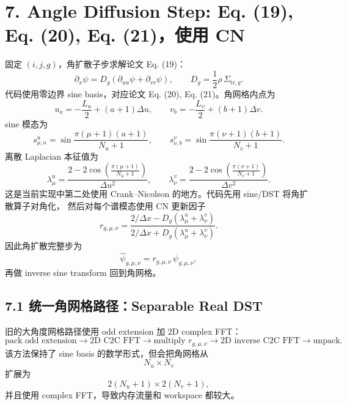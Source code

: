 \documentclass[11pt,a4paper]{ctexart}
\begin{document}
\section*{7. Angle Diffusion Step: Eq. (19), Eq. (20), Eq. (21)，使用 CN}

固定 \((i,j,g)\)，角扩散子步求解论文 Eq. (19)：
\begin{equation}
  \partial_x\psi
  =
  D_g(\partial_{uu}\psi+\partial_{vv}\psi),
  \qquad
  D_g=\frac12\rho\,\Sigma_{\mathrm{tr},g}.
\end{equation}
代码使用零边界 sine basis，对应论文 Eq. (20), Eq. (21)。角网格内点为
\begin{equation}
  u_a=-\frac{L_u}{2}+(a+1)\Delta u,\qquad
  v_b=-\frac{L_v}{2}+(b+1)\Delta v.
\end{equation}
sine 模态为
\begin{equation}
  s^u_{\mu,a}=\sin\frac{\pi(\mu+1)(a+1)}{N_u+1},
  \qquad
  s^v_{\nu,b}=\sin\frac{\pi(\nu+1)(b+1)}{N_v+1}.
\end{equation}
离散 Laplacian 本征值为
\begin{equation}
  \lambda^u_\mu
  =
  \frac{2-2\cos\left(\frac{\pi(\mu+1)}{N_u+1}\right)}{\Delta u^2},
  \qquad
  \lambda^v_\nu
  =
  \frac{2-2\cos\left(\frac{\pi(\nu+1)}{N_v+1}\right)}{\Delta v^2}.
\end{equation}
这是当前实现中第二处使用 Crank--Nicolson 的地方。代码先用 sine/DST 将角扩散算子对角化，
然后对每个谱模态使用 CN 更新因子
\begin{equation}
  r_{g,\mu,\nu}
  =
  \frac{2/\Delta x-D_g(\lambda^u_\mu+\lambda^v_\nu)}
       {2/\Delta x+D_g(\lambda^u_\mu+\lambda^v_\nu)}.
\end{equation}
因此角扩散完整步为
\begin{equation}
  \widehat\psi_{g,\mu,\nu}
  =
  r_{g,\mu,\nu}\,\psi_{g,\mu,\nu},
\end{equation}
再做 inverse sine transform 回到角网格。

\subsection*{7.1 统一角网格路径：Separable Real DST}

旧的大角度网格路径使用 odd extension 加 2D complex FFT：
\begin{equation}
  \text{pack odd extension}
  \rightarrow
  \text{2D C2C FFT}
  \rightarrow
  \text{multiply }r_{g,\mu,\nu}
  \rightarrow
  \text{2D inverse C2C FFT}
  \rightarrow
  \text{unpack}.
\end{equation}
该方法保持了 sine basis 的数学形式，但会把角网格从
\begin{equation}
  N_u\times N_v
\end{equation}
扩展为
\begin{equation}
  2(N_u+1)\times 2(N_v+1),
\end{equation}
并且使用 complex FFT，导致内存流量和 workspace 都较大。
\end{document}
